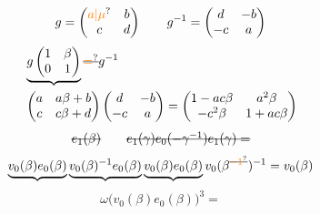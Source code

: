 \[g=\begin{pmatrix}\unsure{a|\mu}&b\\c&d\end{pmatrix}\qquad g^{-1}=\begin{pmatrix}d&-b\\-c&a\end{pmatrix}\]
\[\begin{aligned}
&\underbrace{g\begin{pmatrix}1&\beta\\0&1\end{pmatrix}}\deleted{\unsure{=}}g^{-1}\\
&\begin{pmatrix}a&a\beta+b\\c&c\beta+d\end{pmatrix}\begin{pmatrix}d&-b\\-c&a\end{pmatrix}=\begin{pmatrix}1-ac\beta&a^2\beta\\-c^2\beta&1+ac\beta\end{pmatrix}
\end{aligned}\]
\[\deleted{e_1(\beta)}\qquad \deleted{e_1(\gamma)e_0(-\gamma^{-1})e_1(\gamma)=}\]
\[\underbrace{v_0(\beta)e_0(\beta)}\underbrace{v_0(\beta)^{-1}e_0(\beta)}\underbrace{v_0(\beta)e_0(\beta)}v_0(\beta^{\deleted{\unsure{-1}}})^{-1}=v_0(\beta)\]
\[\omega\big(v_0(\beta)e_0(\beta)\big)^3=\]
